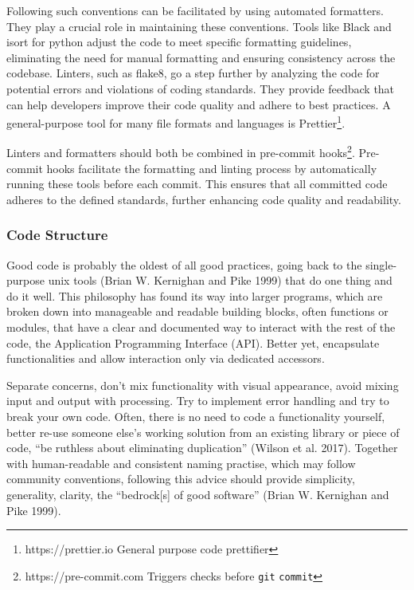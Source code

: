 \documentclass[preprint,11pt,5p]{elsarticle}
\begin{document}
Following such conventions can be facilitated by using automated
formatters. They play a crucial role in maintaining these conventions.
Tools like Black and isort for python adjust the code to meet specific
formatting guidelines, eliminating the need for manual formatting and
ensuring consistency across the codebase. Linters, such as flake8, go a
step further by analyzing the code for potential errors and violations
of coding standards. They provide feedback that can help developers
improve their code quality and adhere to best practices. A
general-purpose tool for many file formats and languages is
Prettier\footnote{https://prettier.io General purpose code prettifier}.

Linters and formatters should both be combined in pre-commit
hooks\footnote{https://pre-commit.com Triggers checks before
  \texttt{git} \texttt{commit}}. Pre-commit hooks facilitate the
formatting and linting process by automatically running these tools
before each commit. This ensures that all committed code adheres to the
defined standards, further enhancing code quality and readability.

\subsubsection{Code Structure}\label{code-structure}

Good code is probably the oldest of all good practices, going back to
the single-purpose unix tools (Brian W. Kernighan and Pike 1999) that do
one thing and do it well. This philosophy has found its way into larger
programs, which are broken down into manageable and readable building
blocks, often functions or modules, that have a clear and documented way
to interact with the rest of the code, the Application Programming
Interface (API). Better yet, encapsulate functionalities and allow
interaction only via dedicated accessors.

Separate concerns, don't mix functionality with visual appearance, avoid
mixing input and output with processing. Try to implement error handling
and try to break your own code. Often, there is no need to code a
functionality yourself, better re-use someone else's working solution
from an existing library or piece of code, ``be ruthless about
eliminating duplication'' (Wilson et al. 2017). Together with
human-readable and consistent naming practise, which may follow
community conventions, following this advice should provide simplicity,
generality, clarity, the ``bedrock{[}s{]} of good software'' (Brian W.
Kernighan and Pike 1999).
\end{document}
